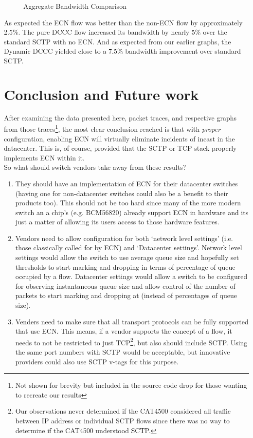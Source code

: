 \documentclass[12pt]{article}
\begin{document}
\begin{figure}[h]
\centering
{}
\caption{Aggregate Bandwidth Comparison}
\label{fig:aggBw}
\end{figure}

As expected the ECN flow was better than the non-ECN flow by approximately 2.5\%. The
pure DCCC flow increased its bandwidth by nearly 5\% over the standard SCTP with no ECN.
And as expected from our earlier graphs, the Dynamic DCCC yielded close to a 7.5\% bandwidth
improvement over standard SCTP.

\section{Conclusion and Future work}

After examining the data presented here, packet traces, and respective
graphs from those traces\footnote{Not shown for brevity but included in the source
code drop for those wanting to recreate our results}, the most clear conclusion reached is that 
with \emph{proper} configuration, enabling ECN will virtually eliminate incidents of
incast in the datacenter. This is, of course, provided that the SCTP or
TCP stack properly implements ECN within it. 
\\

So what should switch vendors take away from these results?

\begin{enumerate}

\item They should have an implementation of ECN for their datacenter switches (having one
for non-datacenter switches could also be a benefit to their products too). This
should not be too hard since many of the more modern switch an a chip's (e.g. BCM56820)
already support ECN in hardware and its just a matter of allowing its users access to those
hardware features.

\item Vendors need to allow configuration for both `network level settings' (i.e. those classically called
for by ECN) and `Datacenter settings'. Network level settings would allow the switch to use average queue
size and hopefully set thresholds to start marking and dropping in terms of percentage of queue occupied by
a flow. Datacenter settings would allow a switch to be configured for observing instantaneous queue size
and allow control of the number of packets to start marking and dropping at (instead of percentages of
queue size).

\item Venders need to make sure that all transport protocols can be fully supported that use ECN. This
means, if a vendor supports the concept of a flow, it needs to not be restricted to just TCP\footnote{Our observations
never determined if the CAT4500 considered all traffic between IP address or individual SCTP flows since there was
no way to determine if the CAT4500 understood SCTP.}, but also should include SCTP. Using the same port
numbers with SCTP would be acceptable, but innovative providers could also use SCTP v-tags for this purpose.

\end{enumerate}
\end{document}
